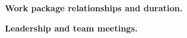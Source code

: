 \documentclass[a4paper,11pt]{article}
\newcommand{\solidbowtie}{\blacktriangleright\!\!\blacktriangleleft}
\newcommand{\deliv}{\textcolor{deliverable}{\raisebox{-.25em}{\DiamondSolid}}}
\newcommand{\teamm}[2]{\raisebox{-.25em}{\ensuremath{\overset{\textup{#1}}{\text{\textcolor{#2}{$\solidbowtie$}}}}}}
\newcommand{\tmN}{\teamm{N}{nottColour}}
\newcommand{\tmS}{\teamm{S}{strathColour}}
\renewcommand{\paragraph}[1]{\textbf{#1.}}
\begin{document}

\paragraph{Work package relationships and duration}


\paragraph{Leadership and team meetings}



\printbibliography
\end{document}
